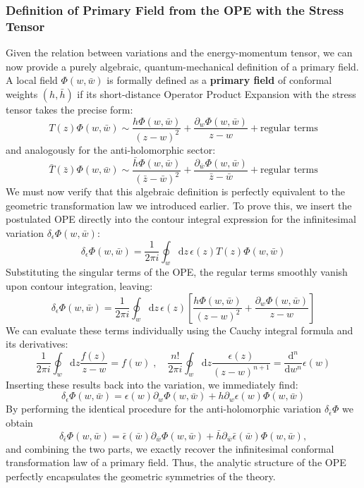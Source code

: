 \subsubsection{Definition of Primary Field from the OPE with the Stress Tensor}

Given the relation between variations and the energy-momentum tensor, we can now provide a purely algebraic, quantum-mechanical definition of a primary field. A local field \(\Phi(w, \bar{w})\) is formally defined as a \textbf{primary field} of conformal weights \((h, \bar{h})\) if its short-distance Operator Product Expansion with the stress tensor takes the precise form:
\[
    T(z) \Phi(w, \bar{w}) \sim \frac{h \Phi(w, \bar{w})}{(z - w)^2} + \frac{\partial_w \Phi(w, \bar{w})}{z - w} + \text{regular terms}
\]
and analogously for the anti-holomorphic sector:
\[
    \bar{T}(\bar{z}) \Phi(w, \bar{w}) \sim \frac{\bar{h} \Phi(w, \bar{w})}{(\bar{z} - \bar{w})^2} + \frac{\partial_{\bar{w}} \Phi(w, \bar{w})}{\bar{z} - \bar{w}} + \text{regular terms}
\]
We must now verify that this algebraic definition is perfectly equivalent to the geometric transformation law we introduced earlier. To prove this, we insert the postulated OPE directly into the contour integral expression for the infinitesimal variation \(\delta_\epsilon \Phi(w, \bar{w})\):
\[
    \delta_\epsilon \Phi(w, \bar{w}) = \frac{1}{2\pi i} \oint_w \mathrm{d} z \, \epsilon(z) T(z) \Phi(w, \bar{w})
\]
Substituting the singular terms of the OPE, the regular terms smoothly vanish upon contour integration, leaving:
\[
    \delta_\epsilon \Phi(w, \bar{w}) = \frac{1}{2\pi i} \oint_w \mathrm{d} z \, \epsilon(z) \left[ \frac{h \Phi(w, \bar{w})}{(z - w)^2} + \frac{\partial_w \Phi(w, \bar{w})}{z - w} \right]
\]
We can evaluate these terms individually using the Cauchy integral formula and its derivatives:
\[
    \frac{1}{2\pi i} \oint_w \mathrm{d} z \frac{f(z)}{z - w} = f(w) \;, \quad \frac{n!}{2\pi i} \oint_w \mathrm{d} z \frac{\epsilon(z)}{(z - w)^{n+1}} = \frac{\mathrm{d}^n}{\mathrm{d} w^n} \epsilon(w)
\]
Inserting these results back into the variation, we immediately find:
\[
    \delta_\epsilon \Phi(w, \bar{w}) = \epsilon(w) \partial_w \Phi(w, \bar{w}) + h \partial_w \epsilon(w) \Phi(w, \bar{w})
\]
By performing the identical procedure for the anti-holomorphic variation \(\delta_{\bar{\epsilon}} \Phi\) we obtain
\[
    \delta_{\bar{\epsilon}} \Phi(w, \bar{w}) = \bar{\epsilon}(\bar{w}) \partial_{\bar{w}} \Phi(w, \bar{w}) + \bar{h} \partial_{\bar{w}} \bar{\epsilon}(\bar{w}) \Phi(w, \bar{w}),
\]
and combining the two parts, we exactly recover the infinitesimal conformal transformation law of a primary field. Thus, the analytic structure of the OPE perfectly encapsulates the geometric symmetries of the theory.